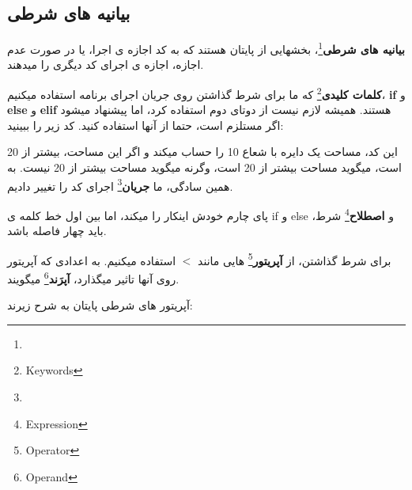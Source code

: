 \documentclass[14pt,a4paper]{memoir}
\begin{document}
	 \subsection{بیانیه های شرطی}\label{pyif}
	 
	 
	 \textbf{بیانیه های شرطی}\footnote{}، بخشهایی از پایتان هستند که به کد اجازه ی اجرا، یا در صورت عدم اجازه، اجازه ی اجرای کد دیگری را میدهند.
	 
	 \textbf{کلمات کلیدی}\footnote{Keywords} که ما برای شرط گذاشتن روی جریان اجرای برنامه استفاده میکنیم، \textbf{if} و \textbf{else} و \textbf{elif} هستند. همیشه لازم نیست از دوتای دوم استفاده کرد، اما پیشنهاد میشود اگر مستلزم است، حتما از آنها استفاده کنید. کد زیر را ببینید:
	 
	 
	 \begin{latin}
	
\end{latin} 
	 
	این کد، مساحت یک دایره با شعاع 10 را حساب میکند و  اگر این مساحت، بیشتر از 20 است، میگوید مساحت بیشتر از 20 است، وگرنه میگوید مساحت بیشتر از 20 نیست. به همین سادگی، ما \textbf{جریان}\footnote{} اجرای کد را تغییر دادیم. 
	
	\begin{tip}
		پای چارم خودش اینکار را میکند، اما بین اول خط کلمه ی if و else و \textbf{اصطلاح}\footnote{Expression} شرط، باید چهار \keys{\space} فاصله باشد.
	\end{tip}


برای شرط گذاشتن، از \textbf{آپریتور}\footnote{Operator} هایی مانند $ < $ استفاده میکنیم. به اعدادی که آپریتور روی آنها تاثیر میگذارد، \textbf{آپرَند}\footnote{Operand} میگویند.

آپریتور های شرطی پایتان به شرح زیرند:
	 
	 
	
\end{document}
